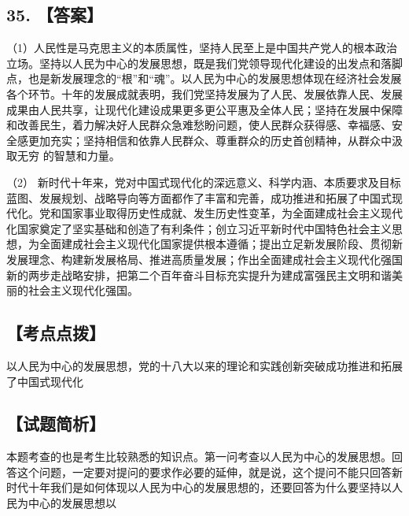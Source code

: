 \documentclass[UTF8,11pt]{ctexart}
\begin{document}
\subsection*{35. 【答案】}

（1）人民性是马克思主义的本质属性，坚持人民至上是中国共产党人的根本政治立场。坚持以人民为中心的发展思想，既是我们党领导现代化建设的出发点和落脚点，也是新发展理念的“根”和“魂”。以人民为中心的发展思想体现在经济社会发展各个环节。十年的发展成就表明，我们党坚持发展为了人民、发展依靠人民、发展成果由人民共享，让现代化建设成果更多更公平惠及全体人民；坚持在发展中保障和改善民生，着力解决好人民群众急难愁盼问题，使人民群众获得感、幸福感、安全感更加充实；坚持相信和依靠人民群众、尊重群众的历史首创精神，从群众中汲取无穷 的智慧和力量。


（2） 新时代十年来，党对中国式现代化的深远意义、科学内涵、本质要求及目标蓝图、发展规划、战略导向等方面都作了丰富和完善，成功推进和拓展了中国式现代化。党和国家事业取得历史性成就、发生历史性变革，为全面建成社会主义现代化国家奠定了坚实基础和创造了有利条件；创立习近平新时代中国特色社会主义思想，为全面建成社会主义现代化国家提供根本遵循；提出立足新发展阶段、贯彻新发展理念、构建新发展格局、推进高质量发展；作出全面建成社会主义现代化强国新的两步走战略安排，把第二个百年奋斗目标充实提升为建成富强民主文明和谐美丽的社会主义现代化强国。


\subsection*{【考点点拨】}

以人民为中心的发展思想，党的十八大以来的理论和实践创新突破成功推进和拓展了中国式现代化


\subsection*{【试题简析】}

本题考查的也是考生比较熟悉的知识点。第一问考查以人民为中心的发展思想。回答这个问题，一定要对提问的要求作必要的延伸，就是说，这个提问不能只回答新时代十年我们是如何体现以人民为中心的发展思想的，还要回答为什么要坚持以人民为中心的发展思想以
\end{document}
